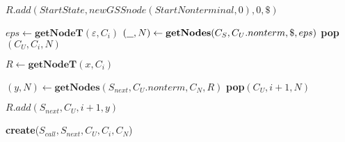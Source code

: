 \begin{algorithmic}
    \State $R.add(StartState, new GSSnode(StartNonterminal,0), 0, \$)$
    
    \State $eps \gets \textbf{getNodeT}(\varepsilon, C_{i})$  
    \State $(\underline{\hspace{0.25cm}}, N) \gets \textbf{getNodes}(C_{S},C_{U}.nonterm, \$, eps)$
    \State \textbf{pop}$(C_{U},C_{i},N)$ 
    \EndIf
    
            \State $R \gets \textbf{getNodeT}(x, C_{i})$
            
            \State $(y, N) \gets \textbf{getNodes}(S_{next},C_{U}.nonterm, C_{N}, R)$
                \State \textbf{pop}$(C_{U},i+1,N)$ 
            \EndIf
            
            \State $R.add(S_{next}, C_{U}, i + 1, y)$
            
        \EndCase
    
            \State \textbf{create}($S_{call}, S_{next}, C_{U}, C_{i}, C_{N}$)
        \EndCase
        \EndSwitch
        
    \EndFor
    \EndWhile
\EndFunction
\end{algorithmic}